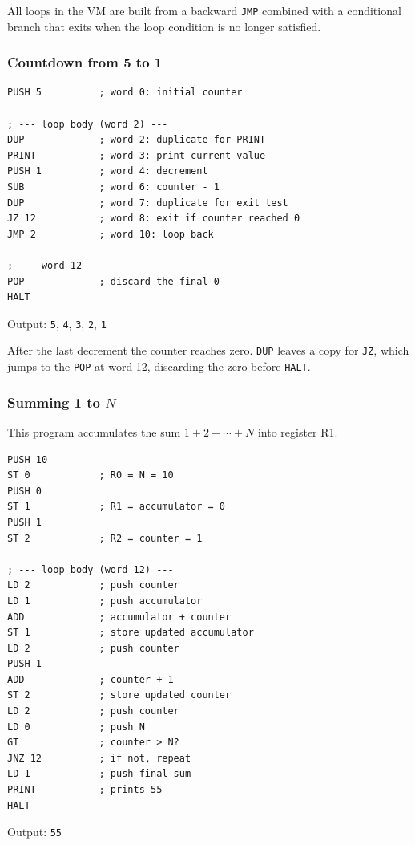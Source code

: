 All loops in the VM are built from a backward \texttt{JMP} combined with a conditional branch that exits when the loop condition is no longer satisfied.

\subsubsection*{Countdown from 5 to 1}

\begin{lstlisting}
PUSH 5          ; word 0: initial counter

; --- loop body (word 2) ---
DUP             ; word 2: duplicate for PRINT
PRINT           ; word 3: print current value
PUSH 1          ; word 4: decrement
SUB             ; word 6: counter - 1
DUP             ; word 7: duplicate for exit test
JZ 12           ; word 8: exit if counter reached 0
JMP 2           ; word 10: loop back

; --- word 12 ---
POP             ; discard the final 0
HALT
\end{lstlisting}

Output: \texttt{5}, \texttt{4}, \texttt{3}, \texttt{2}, \texttt{1}

After the last decrement the counter reaches zero. \texttt{DUP} leaves a copy for \texttt{JZ}, which jumps to the \texttt{POP} at word 12, discarding the zero before \texttt{HALT}.

\subsubsection*{Summing 1 to $N$}

This program accumulates the sum $1 + 2 + \cdots + N$ into register R1.

\begin{lstlisting}
PUSH 10
ST 0            ; R0 = N = 10
PUSH 0
ST 1            ; R1 = accumulator = 0
PUSH 1
ST 2            ; R2 = counter = 1

; --- loop body (word 12) ---
LD 2            ; push counter
LD 1            ; push accumulator
ADD             ; accumulator + counter
ST 1            ; store updated accumulator
LD 2            ; push counter
PUSH 1
ADD             ; counter + 1
ST 2            ; store updated counter
LD 2            ; push counter
LD 0            ; push N
GT              ; counter > N?
JNZ 12          ; if not, repeat
LD 1            ; push final sum
PRINT           ; prints 55
HALT
\end{lstlisting}

Output: \texttt{55}

